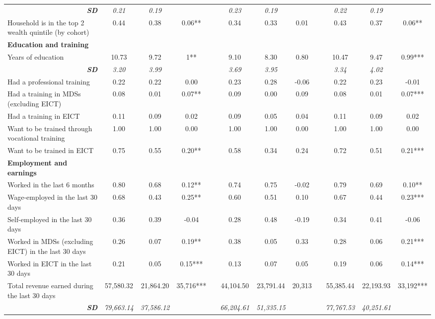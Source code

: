 \begin{landscape}
{\begin{longtable}{m{9cm}ccccccccccc}
\multicolumn{1}{r}{\textit{\textbf{SD}}}&\textit{0.21}&\textit{0.19}&&&\textit{0.23}&\textit{0.19}&&&\textit{0.22}&\textit{0.19}&\\
Household is in the top 2 wealth quintile (by cohort)&0.44&0.38&     0.06**&&0.34&0.33&     0.01 &&0.43&0.37&     0.06**\\
\textbf{Education and training}&&&&&&&&&&&\\
Years of education&10.73&9.72&        1**&&9.10&8.30&     0.80 &&10.47&9.47&     0.99***\\
\multicolumn{1}{r}{\textit{\textbf{SD}}}&\textit{3.20}&\textit{3.99}&&&\textit{3.69}&\textit{3.95}&&&\textit{3.34}&\textit{4.02}&\\
Had a professional training&0.22&0.22&     0.00 &&0.23&0.28&    -0.06 &&0.22&0.23&    -0.01 \\
Had a training in MDSs (excluding EICT)&0.08&0.01&     0.07**&&0.09&0.00&     0.09 &&0.08&0.01&     0.07***\\
Had a training in EICT &0.11&0.09&     0.02 &&0.09&0.05&     0.04 &&0.11&0.09&     0.02 \\
Want to be trained through vocational training&1.00&1.00&     0.00 &&1.00&1.00&     0.00 &&1.00&1.00&     0.00 \\
Want to be trained in EICT&0.75&0.55&     0.20**&&0.58&0.34&     0.24 &&0.72&0.51&     0.21***\\
\textbf{Employment and earnings}&&&&&&&&&&&\\
Worked in the last 6 months&0.80&0.68&     0.12**&&0.74&0.75&    -0.02 &&0.79&0.69&     0.10**\\
Wage-employed in the last 30 days&0.68&0.43&     0.25**&&0.60&0.51&     0.10 &&0.67&0.44&     0.23***\\
Self-employed in the last 30 days&0.36&0.39&    -0.04 &&0.28&0.48&    -0.19 &&0.34&0.41&    -0.06 \\
Worked in MDSs (excluding EICT) in the last 30 days&0.26&0.07&     0.19**&&0.38&0.05&     0.33 &&0.28&0.06&     0.21***\\
Worked in EICT in the last 30 days&0.21&0.05&     0.15***&&0.13&0.07&     0.05 &&0.19&0.06&     0.14***\\
Total revenue earned during the last 30 days&57,580.32&21,864.20&   35,716***&&44,104.50&23,791.44&   20,313 &&55,385.44&22,193.93&   33,192***\\
\multicolumn{1}{r}{\textit{\textbf{SD}}}&\textit{79,663.14}&\textit{37,586.12}&&&\textit{66,204.61}&\textit{51,335.15}&&&\textit{77,767.53}&\textit{40,251.61}&\\

\end{longtable}}
\end{landscape}
